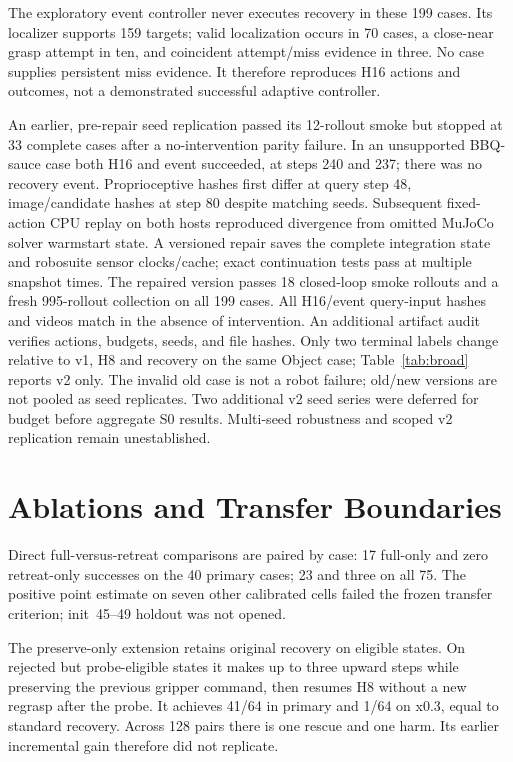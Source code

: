 \documentclass{article}
\begin{document}
The exploratory event controller never executes recovery in these 199 cases.
Its localizer supports 159 targets; valid localization occurs in 70 cases,
a close-near grasp attempt in ten, and coincident attempt/miss evidence in
three. No case supplies persistent miss evidence. It therefore reproduces
H16 actions and outcomes, not a demonstrated successful adaptive controller.

An earlier, pre-repair seed replication passed its 12-rollout smoke but stopped at
33 complete cases after a no-intervention parity failure. In an unsupported
BBQ-sauce case both H16 and event succeeded, at steps 240 and 237; there was
no recovery event. Proprioceptive hashes first differ at query step 48,
image/candidate hashes at step 80 despite matching seeds. Subsequent fixed-action
CPU replay on both hosts reproduced divergence from omitted MuJoCo solver
warmstart state. A versioned repair saves the complete integration state and
robosuite sensor clocks/cache; exact continuation tests pass at multiple
snapshot times. The repaired version passes 18 closed-loop smoke rollouts
and a fresh 995-rollout collection on all 199 cases. All H16/event query-input
hashes and videos match in the absence of intervention. An additional artifact
audit verifies actions, budgets, seeds, and file hashes. Only two terminal
labels change relative to v1, H8 and recovery on the same Object case;
Table~\ref{tab:broad} reports v2 only. The invalid old case is not a robot
failure; old/new versions are not pooled as seed replicates. Two additional
v2 seed series were deferred for budget before aggregate S0 results.
Multi-seed robustness and scoped v2 replication remain unestablished.

\section{Ablations and Transfer Boundaries}
\label{app:bounds}
\begin{table}[ht]
\caption{P3d development ablation. Other calibrated cells are new to the
P3c intervention cohort, not unseen by perception.}
\centering\small
\end{table}
Direct full-versus-retreat comparisons are paired by case:
17 full-only and zero retreat-only successes on the 40 primary cases;
23 and three on all 75. The positive point estimate on seven other calibrated
cells failed the frozen transfer criterion; init~45--49 holdout was not opened.

\begin{table}[ht]
\caption{Latest confirmation: all four arms and both predeclared cohorts.
Transfer has eight x0.3 cells, tasks~1,2,4--9.}
\centering\small
\end{table}
The preserve-only extension retains original recovery on eligible states.
On rejected but probe-eligible states it makes up to three upward steps
while preserving the previous gripper command, then resumes H8 without a
new regrasp after the probe. It achieves 41/64 in primary and 1/64 on x0.3,
equal to standard recovery. Across 128 pairs there is one rescue and one harm.
Its earlier incremental gain therefore did not replicate.
\end{document}
